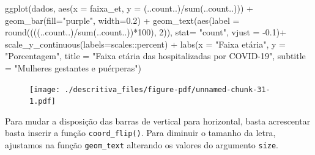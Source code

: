 \documentclass[
  letterpaper,
  DIV=11,
  numbers=noendperiod]{scrreprt}
\newenvironment{Shaded}{\begin{snugshade}}{\end{snugshade}}
\newcommand{\AttributeTok}[1]{\textcolor[rgb]{0.40,0.45,0.13}{#1}}
\newcommand{\DecValTok}[1]{\textcolor[rgb]{0.68,0.00,0.00}{#1}}
\newcommand{\FloatTok}[1]{\textcolor[rgb]{0.68,0.00,0.00}{#1}}
\newcommand{\FunctionTok}[1]{\textcolor[rgb]{0.28,0.35,0.67}{#1}}
\newcommand{\NormalTok}[1]{\textcolor[rgb]{0.00,0.23,0.31}{#1}}
\newcommand{\SpecialCharTok}[1]{\textcolor[rgb]{0.37,0.37,0.37}{#1}}
\newcommand{\StringTok}[1]{\textcolor[rgb]{0.13,0.47,0.30}{#1}}
\begin{document}
\begin{Shaded}
\begin{Highlighting}[]
\FunctionTok{ggplot}\NormalTok{(dados, }\FunctionTok{aes}\NormalTok{(}\AttributeTok{x =}\NormalTok{ faixa\_et, }\AttributeTok{y =}\NormalTok{ (..count..)}\SpecialCharTok{/}\FunctionTok{sum}\NormalTok{(..count..))) }\SpecialCharTok{+}  
  \FunctionTok{geom\_bar}\NormalTok{(}\AttributeTok{fill=}\StringTok{"purple"}\NormalTok{, }\AttributeTok{width=}\FloatTok{0.2}\NormalTok{) }\SpecialCharTok{+} 
  \FunctionTok{geom\_text}\NormalTok{(}\FunctionTok{aes}\NormalTok{(}\AttributeTok{label =} \FunctionTok{round}\NormalTok{((((..count..)}\SpecialCharTok{/}\FunctionTok{sum}\NormalTok{(..count..))}\SpecialCharTok{*}\DecValTok{100}\NormalTok{), }\DecValTok{2}\NormalTok{)), }\AttributeTok{stat=} \StringTok{"count"}\NormalTok{, }\AttributeTok{vjust =} \SpecialCharTok{{-}}\FloatTok{0.1}\NormalTok{)}\SpecialCharTok{+}
  \FunctionTok{scale\_y\_continuous}\NormalTok{(}\AttributeTok{labels=}\NormalTok{scales}\SpecialCharTok{::}\NormalTok{percent) }\SpecialCharTok{+}
  \FunctionTok{labs}\NormalTok{(}\AttributeTok{x =} \StringTok{"Faixa etária"}\NormalTok{, }\AttributeTok{y =} \StringTok{"Porcentagem"}\NormalTok{, }\AttributeTok{title =} \StringTok{"Faixa etária das hospitalizadas por COVID{-}19"}\NormalTok{, }\AttributeTok{subtitle =} \StringTok{"Mulheres gestantes e puérperas"}\NormalTok{)}
\end{Highlighting}
\end{Shaded}

\begin{figure}[H]

{\centering \texttt{[image: ./descritiva\_files/figure-pdf/unnamed-chunk-31-1.pdf]}

}

\end{figure}

Para mudar a disposição das barras de vertical para horizontal, basta
acrescentar basta inserir a função \texttt{coord\_flip()}. Para diminuir
o tamanho da letra, ajustamos na função \texttt{geom\_text} alterando os
valores do argumento \texttt{size}.
\end{document}
